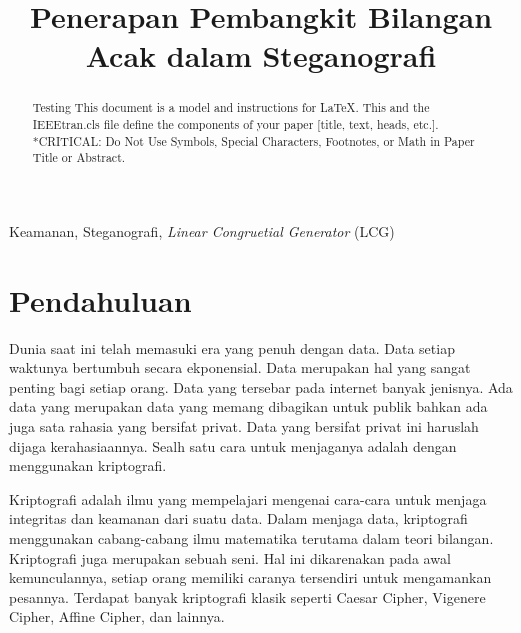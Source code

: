 \documentclass[10pt,conference]{IEEEtran}
\begin{document}
\title{Penerapan Pembangkit Bilangan Acak dalam Steganografi}

\author{
}

\maketitle

\begin{abstract}
Testing This document is a model and instructions for \LaTeX.
This and the IEEEtran.cls file define the components of your paper [title, text, heads, etc.]. *CRITICAL: Do Not Use Symbols, Special Characters, Footnotes, 
or Math in Paper Title or Abstract.
\end{abstract}

\begin{IEEEkeywords}
Keamanan, Steganografi, \emph{Linear Congruetial Generator} (LCG)
\end{IEEEkeywords}

\section{Pendahuluan}
Dunia saat ini telah memasuki era yang penuh dengan data. Data setiap waktunya bertumbuh secara ekponensial. Data merupakan hal yang sangat penting bagi setiap orang. Data yang tersebar pada internet banyak jenisnya. Ada data yang merupakan data yang memang dibagikan untuk publik bahkan ada juga sata rahasia yang bersifat privat. Data yang bersifat privat ini haruslah dijaga kerahasiaannya. Sealh satu cara untuk menjaganya adalah dengan menggunakan kriptografi.

Kriptografi adalah ilmu yang mempelajari mengenai cara-cara untuk menjaga integritas dan keamanan dari suatu data.\cite{b1} Dalam menjaga data, kriptografi menggunakan cabang-cabang ilmu matematika terutama dalam teori bilangan. Kriptografi juga merupakan sebuah seni. Hal ini dikarenakan pada awal kemunculannya, setiap orang memiliki caranya tersendiri untuk mengamankan pesannya. Terdapat banyak kriptografi klasik seperti Caesar Cipher, Vigenere Cipher, Affine Cipher, dan lainnya.
\end{document}
